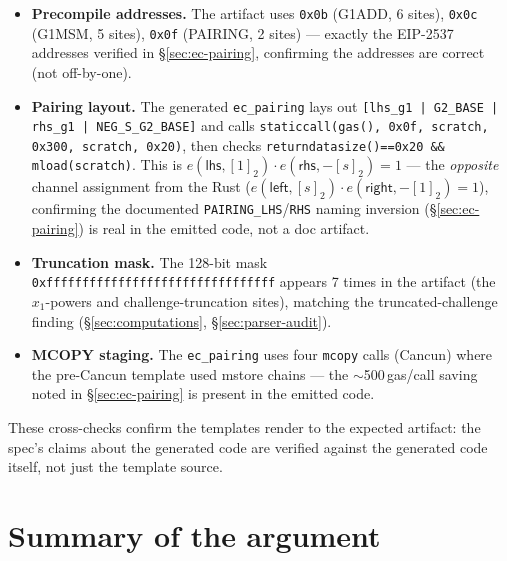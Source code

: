 \begin{itemize}[leftmargin=1.4em,itemsep=1pt]
  \item \textbf{Precompile addresses.} The artifact uses
        \texttt{0x0b} (G1ADD, 6 sites), \texttt{0x0c} (G1MSM, 5 sites),
        \texttt{0x0f} (PAIRING, 2 sites) --- exactly the EIP-2537
        addresses verified in \S\ref{sec:ec-pairing}, confirming the
        addresses are correct (not off-by-one).
  \item \textbf{Pairing layout.} The generated \texttt{ec\_pairing}
        lays out \texttt{[lhs\_\allowbreak{}g1 | G2\_\allowbreak{}BASE | rhs\_\allowbreak{}g1 | NEG\_\allowbreak{}S\_\allowbreak{}G2\_\allowbreak{}BASE]}
        and calls \texttt{staticcall(gas(), 0x0f, scratch, 0x300,
        scratch, 0x20)}, then checks
        \texttt{returndatasize()==0x20 \&\& mload(scratch)}. This is
        $e(\mathsf{lhs},[1]_2)\cdot e(\mathsf{rhs},-[s]_2)=1$ ---
        the \emph{opposite} channel assignment from the Rust
         ($e(\mathsf{left},[s]_2)\cdot
        e(\mathsf{right},-[1]_2)=1$), confirming the documented
        \texttt{PAIRING\_LHS}/\texttt{RHS} naming inversion
        (\S\ref{sec:ec-pairing}) is real in the emitted code, not a
        doc artifact.
  \item \textbf{Truncation mask.} The 128-bit mask
        \texttt{0xffffffffffffffffffffffffffffffff} appears 7 times in
        the artifact (the $x_1$-powers and challenge-truncation sites),
        matching the truncated-challenge finding
        (\S\ref{sec:computations}, \S\ref{sec:parser-audit}).
  \item \textbf{MCOPY staging.} The \texttt{ec\_pairing} uses four
        \texttt{mcopy} calls (Cancun) where the pre-Cancun template used
        mstore chains --- the $\sim$500\,gas/call saving noted in
        \S\ref{sec:ec-pairing} is present in the emitted code.
\end{itemize}

These cross-checks confirm the templates render to the expected
artifact: the spec's claims about the generated code are verified
against the generated code itself, not just the template source.

\section{Summary of the argument}
\label{sec:faith-summary}

